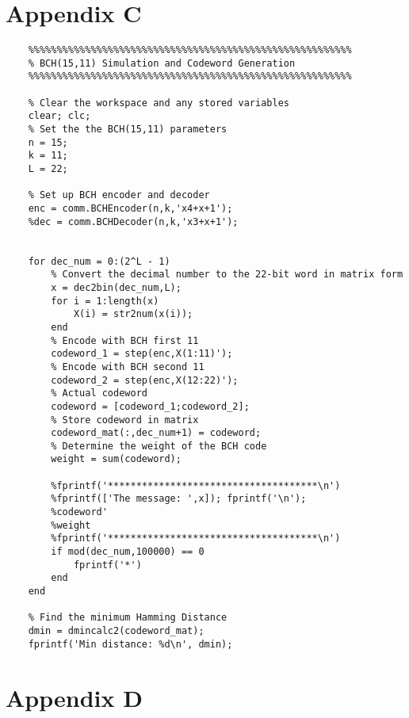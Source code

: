\documentclass{article}
\begin{document}
\section{Appendix C}
\begin{lstlisting}
	%%%%%%%%%%%%%%%%%%%%%%%%%%%%%%%%%%%%%%%%%%%%%%%%%%%%%%%%%
	% BCH(15,11) Simulation and Codeword Generation
	%%%%%%%%%%%%%%%%%%%%%%%%%%%%%%%%%%%%%%%%%%%%%%%%%%%%%%%%%
	
	% Clear the workspace and any stored variables
	clear; clc;
	% Set the the BCH(15,11) parameters
	n = 15;
	k = 11;
	L = 22;
	
	% Set up BCH encoder and decoder
	enc = comm.BCHEncoder(n,k,'x4+x+1');
	%dec = comm.BCHDecoder(n,k,'x3+x+1'); 
	
	
	for dec_num = 0:(2^L - 1)
		% Convert the decimal number to the 22-bit word in matrix form
		x = dec2bin(dec_num,L);
		for i = 1:length(x)
			X(i) = str2num(x(i));
		end
		% Encode with BCH first 11
		codeword_1 = step(enc,X(1:11)');
		% Encode with BCH second 11
		codeword_2 = step(enc,X(12:22)');
		% Actual codeword
		codeword = [codeword_1;codeword_2];
		% Store codeword in matrix
		codeword_mat(:,dec_num+1) = codeword;
		% Determine the weight of the BCH code
		weight = sum(codeword);
	
		%fprintf('*************************************\n')
		%fprintf(['The message: ',x]); fprintf('\n');
		%codeword'
		%weight
		%fprintf('*************************************\n')
		if mod(dec_num,100000) == 0
			fprintf('*')
		end
	end
	
	% Find the minimum Hamming Distance
	dmin = dmincalc2(codeword_mat);
	fprintf('Min distance: %d\n', dmin);
\end{lstlisting}

\newpage



\section{Appendix D}
\end{document}
